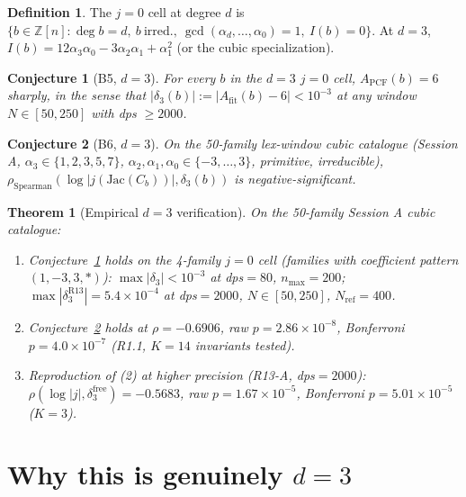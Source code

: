 \documentclass[11pt]{amsart}
\theoremstyle{plain}
\newtheorem{theorem}{Theorem}
\newtheorem{conjecture}{Conjecture}
\theoremstyle{definition}
\newtheorem{definition}{Definition}
\begin{document}
\begin{definition}\label{def:j-zero-cell}
The $j=0$ cell at degree $d$ is
$\{b\in\mathbb{Z}[n]:\deg b=d,\ b\ \text{irred.},\ \gcd
(\alpha_d,\ldots,\alpha_0)=1,\ I(b)=0\}$.
At $d=3$, $I(b)=12\alpha_3\alpha_0-3\alpha_2\alpha_1+\alpha_1^2$
(or the cubic specialization).
\end{definition}

\begin{conjecture}[B5, $d=3$]\label{conj:b5-d3}
For every $b$ in the $d=3$ $j=0$ cell, $A_{\mathrm{PCF}}(b)=6$
sharply, in the sense that $|\delta_3(b)|:=|A_{\mathrm{fit}}(b)-6|
< 10^{-3}$ at any window $N\in[50,250]$ with dps $\geq 2000$.
\end{conjecture}

\begin{conjecture}[B6, $d=3$]\label{conj:b6-d3}
On the 50-family lex-window cubic catalogue (Session A,
$\alpha_3\in\{1,2,3,5,7\}$, $\alpha_2,\alpha_1,\alpha_0\in
\{-3,\ldots,3\}$, primitive, irreducible),
$\rho_{\mathrm{Spearman}}(\log|j(\mathrm{Jac}(C_b))|,\delta_3(b))$
is negative-significant.
\end{conjecture}

\begin{theorem}[Empirical $d=3$ verification]\label{thm:b5-empirical}
On the 50-family Session A cubic catalogue:
\begin{enumerate}
  \item Conjecture~\ref{conj:b5-d3} holds on the 4-family
        $j=0$ cell (families with coefficient pattern
        $(1,-3,3,*)$): $\max |\delta_3| < 10^{-3}$ at
        dps$=80$, $n_{\max}=200$;
        $\max|\delta_3^{\mathrm{R13}}| = 5.4\times 10^{-4}$
        at dps$=2000$, $N\in[50,250]$, $N_{\mathrm{ref}}=400$.
  \item Conjecture~\ref{conj:b6-d3} holds at
        $\rho=-0.6906$, raw $p=2.86\times 10^{-8}$,
        Bonferroni $p=4.0\times 10^{-7}$ (R1.1, $K=14$
        invariants tested).
  \item Reproduction of (2) at higher precision (R13-A,
        dps$=2000$): $\rho(\log|j|,\delta_3^{\mathrm{free}})
        = -0.5683$, raw $p=1.67\times 10^{-5}$, Bonferroni
        $p=5.01\times 10^{-5}$ ($K=3$).
\end{enumerate}
\end{theorem}

\section{Why this is genuinely $d=3$}
\end{document}
